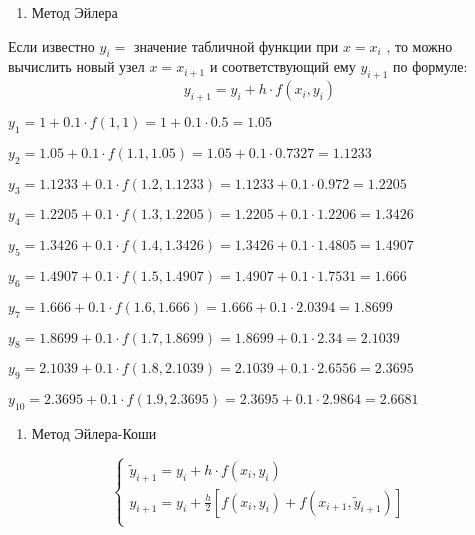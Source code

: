 \documentclass[10pt, a4paper]{scrartcl}
\begin{document}
\vspace{5mm}

\begin{enumerate}
\def\labelenumi{\arabic{enumi}.}
\itemsep1pt\parskip0pt
\item
  Метод Эйлера
\end{enumerate}

Если известно \(y_i =\) значение табличной функции при \(x=x_i\) , то
можно вычислить новый узел \(x=x_{i+1}\) и соответствующий ему
\(y_{i+1}\) по формуле: \[y_{i+1} = y_i + h\cdot f(x_i, y_i)\]

\(\displaystyle y_{1} = 1 + 0.1 \cdot f(1, 1) = 1 + 0.1 \cdot 0.5 = 1.05\)

\(\displaystyle y_{2} = 1.05 + 0.1 \cdot f(1.1, 1.05) = 1.05 + 0.1 \cdot 0.7327 = 1.1233\)

\(\displaystyle y_{3} = 1.1233 + 0.1 \cdot f(1.2, 1.1233) = 1.1233 + 0.1 \cdot 0.972 = 1.2205\)

\(\displaystyle y_{4} = 1.2205 + 0.1 \cdot f(1.3, 1.2205) = 1.2205 + 0.1 \cdot 1.2206 = 1.3426\)

\(\displaystyle y_{5} = 1.3426 + 0.1 \cdot f(1.4, 1.3426) = 1.3426 + 0.1 \cdot 1.4805 = 1.4907\)

\(\displaystyle y_{6} = 1.4907 + 0.1 \cdot f(1.5, 1.4907) = 1.4907 + 0.1 \cdot 1.7531 = 1.666\)

\(\displaystyle y_{7} = 1.666 + 0.1 \cdot f(1.6, 1.666) = 1.666 + 0.1 \cdot 2.0394 = 1.8699\)

\(\displaystyle y_{8} = 1.8699 + 0.1 \cdot f(1.7, 1.8699) = 1.8699 + 0.1 \cdot 2.34 = 2.1039\)

\(\displaystyle y_{9} = 2.1039 + 0.1 \cdot f(1.8, 2.1039) = 2.1039 + 0.1 \cdot 2.6556 = 2.3695\)

\(\displaystyle y_{10} = 2.3695 + 0.1 \cdot f(1.9, 2.3695) = 2.3695 + 0.1 \cdot 2.9864 = 2.6681\)

\begin{enumerate}
\def\labelenumi{\arabic{enumi}.}
\setcounter{enumi}{1}
\itemsep1pt\parskip0pt
\item
  Метод Эйлера-Коши
\end{enumerate}

\[\begin{cases}
\tilde{y}_{i+1} = y_i + h\cdot f(x_i, y_i)\\
y_{i+1} = y_i + \frac{h}{2}[f(x_i, y_i) + f(x_{i+1}, \tilde{y}_{i+1})]\\
\end{cases}\]
\end{document}
